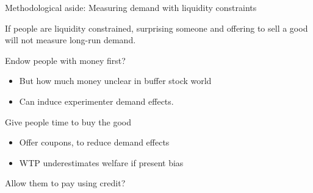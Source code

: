 \documentclass[aspectratio=169, 10pt, handout]{beamer}
\newenvironment{wideitemize}{\itemize\addtolength{\itemsep}{10pt}}{\enditemize}
\begin{document}
\begin{frame}{Methodological aside: Measuring demand with liquidity constraints}

\begin{wideitemize}

	\item If people are liquidity constrained, surprising someone and offering to sell a good will not measure long-run demand.

	\item Endow people with money first?

	\begin{itemize}
	
		\item But how much money unclear in buffer stock world
		\item Can induce experimenter demand effects.

	\end{itemize}

	\item Give people time to buy the good \citep{dupas2009malariaprevent}
	
	\begin{itemize}
	
		\item Offer coupons, to reduce demand effects
		\item WTP underestimates welfare if present bias
	
	\end{itemize}

	\item Allow them to pay using credit?

\end{wideitemize}


\end{frame}
\end{document}
